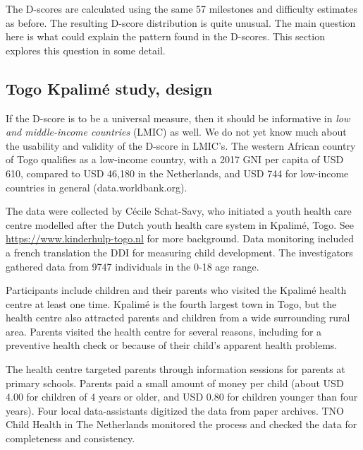 \documentclass[
]{book}
\begin{document}
The D-scores are calculated using the same 57 milestones and difficulty estimates as before. The resulting D-score distribution is quite unusual. The main question here is what could explain the pattern found in the D-scores. This section explores this question in some detail.

\hypertarget{togo-kpalimuxe9-study-design}{%
\subsection{Togo Kpalimé study, design}\label{togo-kpalimuxe9-study-design}}

If the D-score is to be a universal measure, then it should be informative in \emph{low and middle-income countries} (LMIC) as well. We do not yet know much about the usability and validity of the D-score in LMIC's. The western African country of Togo qualifies as a low-income country, with a 2017 GNI per capita of USD 610, compared to USD 46,180 in the Netherlands, and USD 744 for low-income countries in general (data.worldbank.org).

The data were collected by Cécile Schat-Savy, who initiated a youth health care centre modelled after the Dutch youth health care system in Kpalimé, Togo. See \url{https://www.kinderhulp-togo.nl} for more background. Data monitoring included a french translation the DDI for measuring child development. The investigators gathered data from 9747 individuals in the 0-18 age range.

Participants include children and their parents who visited the Kpalimé health centre at least one time. Kpalimé is the fourth largest town in Togo, but the health centre also attracted parents and children from a wide surrounding rural area. Parents visited the health centre for several reasons, including for a preventive health check or because of their child's apparent health problems.

The health centre targeted parents through information sessions for parents at primary schools. Parents paid a small amount of money per child (about USD 4.00 for children of 4 years or older, and USD 0.80 for children younger than four years). Four local data-assistants digitized the data from paper archives. TNO Child Health in The Netherlands monitored the process and checked the data for completeness and consistency.
\end{document}
